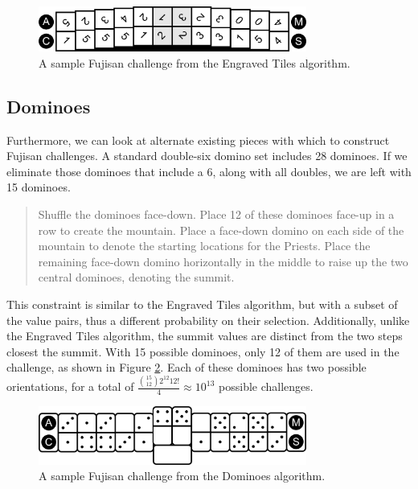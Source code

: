 \documentclass[10pt,journal,compsoc]{IEEEtran}
\begin{document}
\begin{figure}[b]
\includegraphics[width=8.8cm]{graphics/fujisan-engraved.png}
\caption{A sample Fujisan challenge from the Engraved Tiles algorithm.}
\label{fig:tileexample}
\end{figure}


\subsection{Dominoes}
Furthermore, we can look at alternate existing pieces with which to construct Fujisan challenges. A standard double-six domino set includes 28 dominoes. If we eliminate those dominoes that include a 6, along with all doubles, we are left with 15 dominoes. 

\begin{quote}
    
  Shuffle the dominoes face-down. Place 12 of these dominoes face-up in a row to create the mountain. Place a face-down domino on each side of the mountain to denote the starting locations for the Priests. Place the remaining face-down domino horizontally in the middle to raise up the two central dominoes, denoting the summit.
\end{quote}

This constraint is similar to the Engraved Tiles algorithm, but with a subset of the value pairs, thus a different probability on their selection.  Additionally, unlike the Engraved Tiles algorithm, the summit values are distinct from the two steps closest the summit.
With 15 possible dominoes, only 12 of them are used in the challenge, as shown in Figure \ref{fig:dominoexample}. Each of these dominoes has two possible orientations, for a total of $\frac{{15 \choose 12}2^{12}12!}{4} \approx 10^{13}$ possible challenges. 

\begin{figure}[b]
\includegraphics[width=8.8cm]{graphics/dominoexample.png}
\caption{A sample Fujisan challenge from the Dominoes algorithm.}
\label{fig:dominoexample}
\end{figure}
\end{document}

